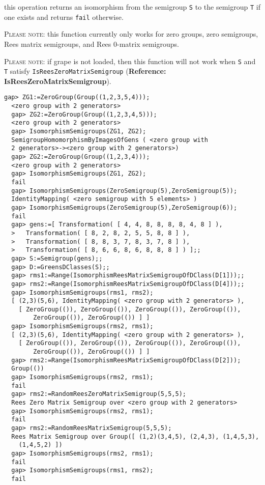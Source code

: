 \documentclass[a4paper,11pt]{report}
\begin{document}
{{{ this operation returns an isomorphism from the semigroup \texttt{S} to the semigroup \texttt{T} if one exists and returns \texttt{fail} otherwise. 

 \textsc{Please note:} this function currently only works for zero groups, zero semigroups, Rees
matrix semigroups, and Rees 0-matrix semigroups.

 \textsc{Please note:} if \textsf{grape} is not loaded, then this function will not work when \texttt{S} and \texttt{T} satisfy \texttt{IsReesZeroMatrixSemigroup} (\textbf{Reference: IsReesZeroMatrixSemigroup}). 
\begin{Verbatim}[fontsize=\small,frame=single,label=Example]
  gap> ZG1:=ZeroGroup(Group((1,2,3,5,4)));
  <zero group with 2 generators>
  gap> ZG2:=ZeroGroup(Group((1,2,3,4,5)));
  <zero group with 2 generators>
  gap> IsomorphismSemigroups(ZG1, ZG2);
  SemigroupHomomorphismByImagesOfGens ( <zero group with 
  2 generators>-><zero group with 2 generators>)
  gap> ZG2:=ZeroGroup(Group((1,2,3,4)));
  <zero group with 2 generators>
  gap> IsomorphismSemigroups(ZG1, ZG2);
  fail
  gap> IsomorphismSemigroups(ZeroSemigroup(5),ZeroSemigroup(5));
  IdentityMapping( <zero semigroup with 5 elements> )
  gap> IsomorphismSemigroups(ZeroSemigroup(5),ZeroSemigroup(6));
  fail
  gap> gens:=[ Transformation( [ 4, 4, 8, 8, 8, 8, 4, 8 ] ), 
  >   Transformation( [ 8, 2, 8, 2, 5, 5, 8, 8 ] ), 
  >   Transformation( [ 8, 8, 3, 7, 8, 3, 7, 8 ] ), 
  >   Transformation( [ 8, 6, 6, 8, 6, 8, 8, 8 ] ) ];;
  gap> S:=Semigroup(gens);;
  gap> D:=GreensDClasses(S);;
  gap> rms1:=Range(IsomorphismReesMatrixSemigroupOfDClass(D[1]));;
  gap> rms2:=Range(IsomorphismReesMatrixSemigroupOfDClass(D[4]));;
  gap> IsomorphismSemigroups(rms1, rms2);
  [ (2,3)(5,6), IdentityMapping( <zero group with 2 generators> ), 
    [ ZeroGroup(()), ZeroGroup(()), ZeroGroup(()), ZeroGroup(()), 
        ZeroGroup(()), ZeroGroup(()) ] ]
  gap> IsomorphismSemigroups(rms2, rms1);
  [ (2,3)(5,6), IdentityMapping( <zero group with 2 generators> ), 
    [ ZeroGroup(()), ZeroGroup(()), ZeroGroup(()), ZeroGroup(()),  
        ZeroGroup(()), ZeroGroup(()) ] ]
  gap> rms2:=Range(IsomorphismReesMatrixSemigroupOfDClass(D[2]));
  Group(())
  gap> IsomorphismSemigroups(rms2, rms1);
  fail
  gap> rms2:=RandomReesZeroMatrixSemigroup(5,5,5);
  Rees Zero Matrix Semigroup over <zero group with 2 generators>
  gap> IsomorphismSemigroups(rms2, rms1);
  fail
  gap> rms2:=RandomReesMatrixSemigroup(5,5,5);
  Rees Matrix Semigroup over Group([ (1,2)(3,4,5), (2,4,3), (1,4,5,3), 
    (1,4,5,2) ])
  gap> IsomorphismSemigroups(rms2, rms1);
  fail
  gap> IsomorphismSemigroups(rms1, rms2);
  fail
  	

\end{Verbatim}}}}
\end{document}
